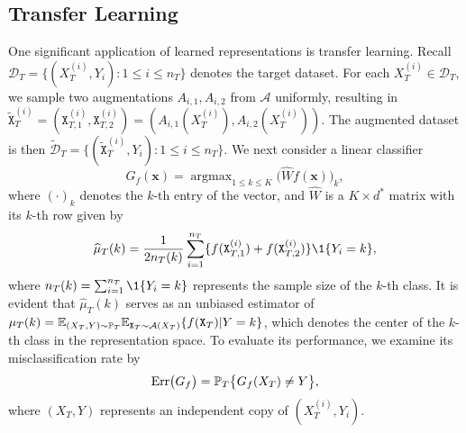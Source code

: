 \subsection{Transfer Learning}\label{subsection: transfer learning}
One significant application of learned representations is transfer learning. Recall $\mathcal{D}_T = \{(X_T^{(i)}, Y_i): 1 \leq i \leq n_T\}$ denotes the target dataset. For each $X_T^{(i)} \in \mathcal{D}_T$, we sample two augmentations $A_{i,1}, A_{i,2}$ from $\mathcal{A}$ uniformly, resulting in $\tilde{\mathtt{X}}_T^{(i)} = (\mathtt{X}_{T,1}^{(i)}, \mathtt{X}_{T, 2}^{(i)}) =(A_{i,1}(X_T^{(i)}), A_{i,2}(X_T^{(i)}))$. The augmented dataset is then $\widetilde{\mathcal{D}}_T=\{(\tilde{\mathtt{X}}_T^{(i)}, Y_i): 1 \leq i \leq n_T\}$. We next consider a linear classifier
\begin{equation}\label{eq: linear probe}
G_f(\bm{x})=\mathop{\arg\max}_{1\leq k \leq K}\big(\widehat{W}f(\bm{x})\big)_k,
\end{equation}
where $(\cdot)_k$ denotes the $k$-th entry of the vector, and $\widehat{W}$ is a $K \times d^*$ matrix with its $k$-th row given by 
\begin{align}\label{eq: hatμT(k)}
    \widehat{\mu}_T(k)=\frac{1}{2n_{T}(k)}\sum_{i=1}^{n_T}\{f(\mathtt{X}_{T,1}^{(i)}) + f(\mathtt{X}_{T,2}^{(i)})\}\1\{Y_i = k\},
\end{align}
where $n_T(k) = \sum_{i=1}^{n_T}\1\{Y_i = k\}$ represents the sample size of the $k$-th class. It is evident that $\widehat{\mu}_T(k)$ serves as an unbiased estimator of $\mu_T(k) = \E_{(X_T, Y) \sim \P_T}\E_{\mathtt{X}_T \sim \mathcal{A}(X_T)}\{f(\mathtt{X}_T) \vert Y = k\}$, which denotes the center of the $k$-th class in the representation space. To evaluate its performance, we examine its misclassification rate by
\begin{align*}
    \mathrm{Err}\big(G_f\big) = \P_T\big\{G_f(X_T) \neq Y\big\},
\end{align*}
where $(X_T, Y)$ represents an independent copy of $(X_T^{(i)}, Y_i)$.